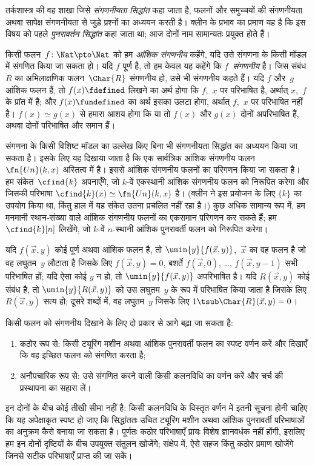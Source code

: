\documentclass[../../../include/open-logic-section]{subfiles}
\begin{document}

तर्कशास्त्र की वह शाखा जिसे \emph{संगणनीयता सिद्धांत} कहा जाता है,
फलनों और समुच्चयों की संगणनीयता अथवा सापेक्ष संगणनीयता से जुड़े
प्रश्नों का अध्ययन करती है। क्लीन के प्रभाव का प्रमाण यह है कि इस
विषय को पहले \emph{पुनरावर्तन सिद्धांत} कहा जाता था; आज दोनों नाम
सामान्यतः प्रयुक्त होते हैं।

किसी फलन~$f\colon \Nat \pto \Nat$ को हम \emph{आंशिक संगणनीय} कहेंगे,
यदि उसे संगणना के किसी मॉडल में संगणित किया जा सकता हो। यदि $f$ पूर्ण
है, तो हम केवल यह कहेंगे कि $f$~\emph{संगणनीय} है। जिस संबंध~$R$ का
अभिलाक्षणिक फलन~$\Char{R}$ संगणनीय हो, उसे भी संगणनीय कहते हैं। यदि
$f$ और~$g$ आंशिक फलन हैं, तो $f(x) \fdefined$ लिखने का अर्थ होगा कि
$f$,~$x$ पर परिभाषित है, अर्थात् $x$,~$f$ के प्रांत में है; और
$f(x) \fundefined$ का अर्थ इसका उलटा होगा, अर्थात् $f$,~$x$ पर
परिभाषित नहीं है। $f(x) \simeq g(x)$ से हमारा आशय होगा कि या तो
$f(x)$ और $g(x)$ दोनों अपरिभाषित हैं, अथवा दोनों परिभाषित और समान हैं।

संगणना के किसी विशिष्ट मॉडल का उल्लेख किए बिना भी संगणनीयता सिद्धांत
का अध्ययन किया जा सकता है। इसके लिए यह दिखाया जाता है कि एक सार्वत्रिक
आंशिक संगणनीय फलन~$\fn{Un}(k, x)$ अस्तित्व में है। इससे आंशिक संगणनीय
फलनों का परिगणन किया जा सकता है। हम संकेत~$\cfind{k}$ अपनाएँगे, जो
$k$-वें एकस्थानी आंशिक संगणनीय फलन को निरूपित करेगा और जिसकी परिभाषा
$\cfind{k}(x) \simeq \fn{Un}(k, x)$ है। (क्लीन ने इस प्रयोजन के लिए
$\{ k \}$ का उपयोग किया था, किंतु हाल में यह संकेत उतना प्रचलित नहीं
रहा है।) कुछ अधिक सामान्य रूप में, हम मनमानी स्थान-संख्या वाले आंशिक
संगणनीय फलनों का एकसमान परिगणन कर सकते हैं; हम $\cfind{k}[n]$ लिखेंगे,
जो $k$-वें $n$-स्थानी आंशिक पुनरावर्ती फलन को निरूपित करेगा।

यदि $f(\vec x, y)$ कोई पूर्ण अथवा आंशिक फलन है, तो $\umin{y}{f
(\vec x, y)}$,~$\vec x$ का वह फलन है जो वह लघुतम~$y$ लौटाता है जिसके
लिए $f(\vec x, y) = 0$, बशर्ते $f(\vec x, 0)$, \dots,
$f(\vec x, y-1)$ सभी परिभाषित हों; यदि ऐसा कोई $y$ न हो, तो
$\umin{y}{f (\vec x, y)}$ अपरिभाषित है। यदि $R(\vec x, y)$ कोई संबंध
है, तो $\umin{y}{R(\vec x, y)}$ को उस लघुतम~$y$ के रूप में परिभाषित
किया जाता है जिसके लिए $R(\vec x, y)$ सत्य हो; दूसरे शब्दों में, वह
लघुतम~$y$ जिसके लिए $1 \tsub \Char{R}(\vec x, y) = 0$।

किसी फलन को संगणनीय दिखाने के लिए दो प्रकार से आगे बढ़ा जा सकता है:
\begin{enumerate}
\item कठोर रूप से: किसी ट्यूरिंग मशीन अथवा आंशिक पुनरावर्ती फलन का
  स्पष्ट वर्णन करें और दिखाएँ कि वह इच्छित फलन को संगणित करता है;
\item अनौपचारिक रूप से: उसे संगणित करने वाली किसी कलनविधि का वर्णन
  करें और चर्च की प्रस्थापना का सहारा लें।
\end{enumerate}
इन दोनों के बीच कोई तीखी सीमा नहीं है; किसी कलनविधि के विस्तृत वर्णन
में इतनी सूचना होनी चाहिए कि यह अपेक्षाकृत स्पष्ट हो जाए कि सिद्धांततः
उचित ट्यूरिंग मशीन अथवा आंशिक पुनरावर्ती परिभाषाओं का अनुक्रम कैसे
बनाया जा सकता है। पूर्णतः कठोर परिभाषाएँ प्रायः विशेष ज्ञानवर्धक नहीं
होंगी, इसलिए हम इन दोनों दृष्टियों के बीच उपयुक्त संतुलन खोजेंगे; संक्षेप
में, ऐसे सहज किंतु कठोर प्रमाण खोजेंगे जिनसे सटीक परिभाषाएँ प्राप्त की
जा सकें।
\end{document}
